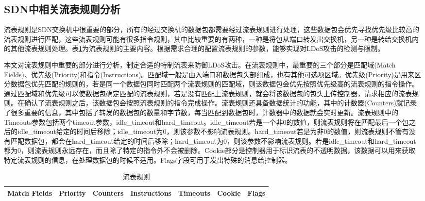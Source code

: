 \subsection{SDN中相关流表规则分析}
\label{chap4:flowruleanalysis}

流表规则是SDN交换机中很重要的部分，所有的经过交换机的数据包都需要经过流表规则进行处理，这些数据包会优先寻找优先级比较高的流表规则进行匹配，这些流表规则可能有很多指令规则，其中比较重要的有两种，一种是将包从端口转发出交换机，另一种是转给交换机内的其他流表规则处理。表\ref{table:flowrule}为流表规则的主要内容。根据需求合理的配置流表规则的参数，能够实现对LDoS攻击的检测与限制。

本文对流表规则中重要的部分进行分析，制定合适的特制流表来防御LDoS攻击。在流表规则中，最重要的三个部分是匹配域(Match Fields)、优先级(Priority)和指令(Instructions)。匹配域一般是由入端口和数据包头部组成，也有其他可选项区域。优先级(Priority)是用来区分数据包优先匹配的规则的，若是同一个数据包同时匹配两个流表规则的匹配域，则该数据包会优先按照优先级高的流表规则的指令操作。通过匹配域和优先级可以使数据包确定匹配的流表规则，若是没有匹配上流表规则，就会将该数据包的包头上传控制器，请求相应的流表规则。在确认了流表规则之后，该数据包会按照流表规则的指令完成操作。流表规则还具备数据统计的功能，其中的计数器(Counters)就记录了很多重要的信息，其中包括了转发的数据包的数量和字节数，每当匹配到数据包时，计数器中的数据就会实时更新。流表规则中的Timeouts参数包括两个timeout参数，idle\_timeout和hard\_timeout。idle\_timeout若是一个非0的数值，则流表规则将在匹配最后一个包之后的idle\_timeout给定的时间后移除；idle\_timeout为0，则该参数不影响流表规则。hard\_timeout若是为非0的数值，则流表规则不管有没有匹配数据包，都会在hard\_timeout给定的时间后移除；hard\_timeout为0，则该参数不影响流表规则。若是idle\_timeout和hard\_timeout都为0，则流表规则永远存在，而且除了特定的指令外不会被删除。Cookie部分是控制器用于标识流表的不透明数据，该数据可以用来获取特定流表规则的信息，在处理数据包的时候不适用。Flags字段可用于发出特殊的消息给控制器。


\begin{table}[htbp]
	\centering  %
	\caption{流表规则}  %
	\label{table:flowrule}  %
	\begin{tabular}{|c|c|c|c|c|c|c|}  
		\hline  %
        Match Fields & Priority & Counters & Instructions & Timeouts & Cookie & Flags \\  %
        \hline
		
	\end{tabular}
\end{table}

